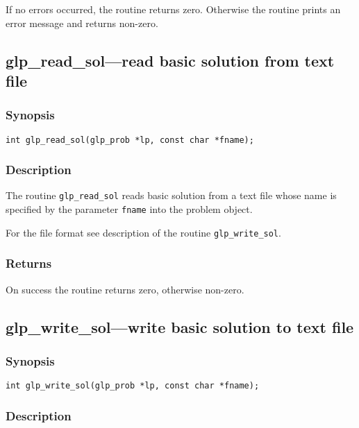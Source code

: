 If no errors occurred, the routine returns zero. Otherwise the routine
prints an error message and returns non-zero.

\subsection{glp\_read\_sol---read basic solution from text file}

\subsubsection*{Synopsis}

\begin{verbatim}
int glp_read_sol(glp_prob *lp, const char *fname);
\end{verbatim}

\subsubsection*{Description}

The routine \verb|glp_read_sol| reads basic solution from a text file
whose name is specified by the parameter \verb|fname| into the problem
object.

For the file format see description of the routine \verb|glp_write_sol|.

\subsubsection*{Returns}

On success the routine returns zero, otherwise non-zero.

\newpage

\subsection{glp\_write\_sol---write basic solution to text file}

\subsubsection*{Synopsis}

\begin{verbatim}
int glp_write_sol(glp_prob *lp, const char *fname);
\end{verbatim}

\subsubsection*{Description}

